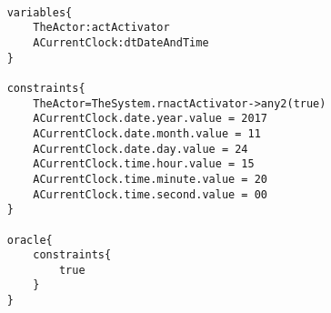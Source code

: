 	\scriptsize
	\vspace{0.5cm}
	\begin{lstlisting}[style=MessirStyle,firstnumber=auto,captionpos=b,caption={\msrmessir (MCL-oriented) specification of the test step \emph{testcase01-ts02oeSetClock}.},label=TM-testcase01-ts02oeSetClock-MCL-LST]

	variables{
		TheActor:actActivator
		ACurrentClock:dtDateAndTime
	}
	
	constraints{
		TheActor=TheSystem.rnactActivator->any2(true)
		ACurrentClock.date.year.value = 2017
		ACurrentClock.date.month.value = 11
		ACurrentClock.date.day.value = 24
		ACurrentClock.time.hour.value = 15
		ACurrentClock.time.minute.value = 20
		ACurrentClock.time.second.value = 00
	}
	
	oracle{
		constraints{
			true
		}
	}
	
	\end{lstlisting}
	\normalsize 
	
	
